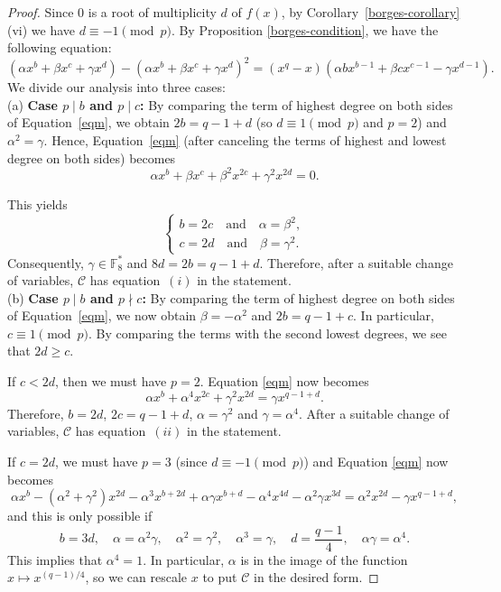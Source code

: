 \documentclass[preprint,12pt]{elsarticle}
\begin{document}
\begin{proof}
 Since $0$ is a root of multiplicity $d$ of $f(x)$, by Corollary~\ref{borges-corollary} (vi) we have
$d \equiv -1 \pmod{p}$. By Proposition \ref{borges-condition}, we have the following equation:
\begin{equation}\label{eqm}
(\alpha x^{b} + \beta x^c + \gamma x^d) - (\alpha x^{b} + \beta x^c + \gamma x^d)^2
= (x^q - x)(\alpha b x^{b-1} + \beta c x^{c-1} - \gamma  x^{d-1}).
\end{equation}
We divide our analysis into three cases:
\\

\noindent (a) \textbf{Case $p \mid b$ and $p \mid c$:}
By comparing the term of highest degree on both sides of Equation~\eqref{eqm}, we obtain $2b = q - 1 + d$ (so
$d \equiv 1 \pmod{p}$ and $p = 2$) and $\alpha^2 = \gamma$. Hence, Equation~\eqref{eqm} (after canceling the terms of highest and lowest degree on both sides) becomes
\begin{equation*}
\alpha x^b + \beta x^c + \beta^2 x^{2c} + \gamma^2 x^{2d} = 0.
\end{equation*}

This yields
\[
\begin{cases}
b = 2c \quad \text{and} \quad \alpha = \beta^2, \\
c = 2d \quad \text{and} \quad \beta = \gamma^2.
\end{cases}
\]
Consequently, $\gamma \in \mathbb{F}_{8}^{*}$ and $8d = 2b = q - 1 + d$.
Therefore, after a suitable change of variables, $\mathcal{C}$ has equation~$(i)$ in the statement.
\\

\noindent (b) \textbf{Case $p \mid b$ and $p \nmid c$:} By comparing the term of highest degree on both sides of Equation~\eqref{eqm}, we now obtain $\beta = - \alpha^2$ and $2b = q - 1 + c$. In particular, $c \equiv 1 \pmod{p}$. By comparing the terms with the second lowest degrees, we see that $2d \geq c$. 

If $c < 2d$, then we must have $p = 2$. Equation \eqref{eqm} now becomes
$$\alpha x^b + \alpha^4 x^{2c} + \gamma^2 x^{2d} = \gamma x^{q - 1 + d}.$$
Therefore, $b = 2d$, $2c = q - 1 + d$, $\alpha = \gamma^2$ and $\gamma = \alpha^4$. After a suitable change of variables, $\mathcal{C}$ has equation~$(ii)$ in the statement.

If $c = 2d$, we must have $p = 3$ (since $d \equiv -1 \pmod{p}$) and Equation \eqref{eqm} now becomes
$$\alpha x^b - (\alpha^2 + \gamma^2) x^{2d} - \alpha^3 x^{b + 2d} + \alpha \gamma x^{b + d} - \alpha^4 x^{4d} - \alpha^2 \gamma x^{3d} = \alpha^2 x^{2d} - \gamma x^{q - 1 + d},$$
and this is only possible if
$$b = 3d,\quad \alpha = \alpha^2\gamma,\quad \alpha^2 = \gamma^2,\quad \alpha^3 = \gamma,\quad d = \frac{q-1}{4},\quad \alpha\gamma = \alpha^4.$$
This implies that $\alpha^4 = 1$. In particular, $\alpha$ is in the image of the function $x \mapsto x^{(q-1)/4}$, so we can rescale $x$ to put $\mathcal{C}$ in the desired form.


\end{proof}
\end{document}
